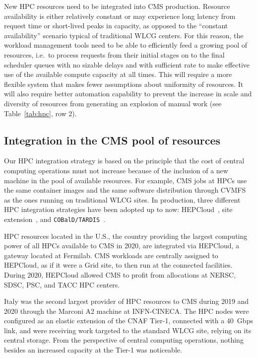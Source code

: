 \documentclass{cmspaper}
\begin{document}
New HPC resources need to be integrated into CMS production. Resource availability is either relatively constant or may experience long latency from request time or short-lived peaks in capacity, as opposed to the ``constant availability'' scenario typical of traditional WLCG centers. For this reason, the workload management tools need to be able to efficiently feed a growing pool of resources, i.e.~to process requests from their initial stages on to the final scheduler queues with no sizable delays and with sufficient rate to make effective use of the available compute capacity at all times. This will require a more flexible system that makes fewer assumptions about uniformity of resources. It will also require better automation capability to prevent the increase in scale and diversity of resources from generating an explosion of manual work (see Table~\ref{tab:hpc}, row 2).

\subsection{Integration in the CMS pool of resources}

Our HPC integration strategy is based on the principle that the cost of central computing operations must not increase because of the inclusion of a new machine in the pool of available resources. For example, CMS jobs at HPCs use the same container images and the same software distribution through CVMFS~\cite{Blomer_2011} as the ones running on traditional WLCG sites. In production, three different HPC integration strategies have been adopted up to now: HEPCloud~\cite{Holzman:2291124}, site extension~\cite{Boccali:2020lcd, dellAgnello:2019tnw}, and \texttt{COBalD/TARDIS}~\cite{manuel_giffels_2018_2240606, max_fischer_2018_1887873}.

HPC resources located in the U.S., the country providing the largest computing power of all HPCs available to CMS in 2020, are integrated via HEPCloud, a gateway located at Fermilab. CMS workloads are centrally assigned to HEPCloud, as if it were a Grid site, to then run at the connected facilities. During 2020, HEPCloud allowed CMS to profit from allocations at NERSC, SDSC, PSC, and TACC HPC centers.

Italy was the second largest provider of HPC resources to CMS during 2019 and 2020 through the Marconi A2 machine at INFN-CINECA. The HPC nodes were configured as an elastic extension of the CNAF Tier-1, connected with a 40~Gbps link, and were receiving work targeted to the standard WLCG site, relying on its central storage. From the perspective of central computing operations, nothing besides an increased capacity at the Tier-1 was noticeable.
\end{document}
